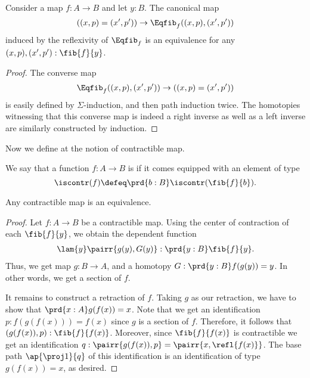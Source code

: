 \begin{prp}
  Consider a map $f:A\to B$ and let $y:B$. The canonical map
  \begin{equation*}
    ((x,p)=(x',p'))\to\Eqfib_f((x,p),(x',p'))
  \end{equation*}
  induced by the reflexivity of $\Eqfib_f$ is an equivalence for any $(x,p),(x',p'):\fib{f}{y}$.
\end{prp}

\begin{proof}
  The converse map
  \begin{equation*}
    \Eqfib_f((x,p),(x',p'))\to ((x,p)=(x',p'))
  \end{equation*}
  is easily defined by $\Sigma$-induction, and then path induction twice. The homotopies witnessing that this converse map is indeed a right inverse as well as a left inverse are similarly constructed by induction.
\end{proof}

Now we define at the notion of contractible map.

\begin{defn}
We say that a function $f:A\to B$ is  if it comes equipped with an element of type
\begin{equation*}
\iscontr(f)\defeq\prd{b:B}\iscontr(\fib{f}{b}).
\end{equation*}
\end{defn}

\begin{thm}\label{thm:equiv_contr}
Any contractible map is an equivalence.
\end{thm}

\begin{proof}
Let $f:A\to B$ be a contractible map. Using the center of contraction of each $\fib{f}{y}$, we obtain the dependent function
\begin{align*}
\lam{y}\pairr{g(y),G(y)}:\prd{y:B}\fib{f}{y}.
\end{align*}
Thus, we get map $g:B\to A$, and a homotopy $G:\prd{y:B} f(g(y))=y$. In other words, we get a section of $f$.

It remains to construct a retraction of $f$. Taking $g$ as our retraction, we have to show that $\prd{x:A} g(f(x))=x$. Note that we get an identification $p:f(g(f(x)))=f(x)$ since $g$ is a section of $f$. Therefore, it follows that $(g(f(x)),p):\fib{f}{f(x)}$. Moreover, since $\fib{f}{f(x)}$ is contractible we get an identification $q:\pairr{g(f(x)),p}=\pairr{x,\refl{f(x)}}$. The base path $\ap{\proj 1}{q}$ of this identification is an identification of type $g(f(x))=x$, as desired.
\end{proof}

